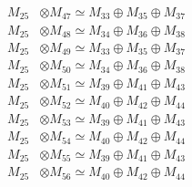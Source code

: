 \begin{align*}
M_{25} &\otimes M_{47} \simeq M_{33} \oplus M_{35} \oplus M_{37} \\
M_{25} &\otimes M_{48} \simeq M_{34} \oplus M_{36} \oplus M_{38} \\
M_{25} &\otimes M_{49} \simeq M_{33} \oplus M_{35} \oplus M_{37} \\
M_{25} &\otimes M_{50} \simeq M_{34} \oplus M_{36} \oplus M_{38} \\
M_{25} &\otimes M_{51} \simeq M_{39} \oplus M_{41} \oplus M_{43} \\
M_{25} &\otimes M_{52} \simeq M_{40} \oplus M_{42} \oplus M_{44} \\
M_{25} &\otimes M_{53} \simeq M_{39} \oplus M_{41} \oplus M_{43} \\
M_{25} &\otimes M_{54} \simeq M_{40} \oplus M_{42} \oplus M_{44} \\
M_{25} &\otimes M_{55} \simeq M_{39} \oplus M_{41} \oplus M_{43} \\
M_{25} &\otimes M_{56} \simeq M_{40} \oplus M_{42} \oplus M_{44} \\
\end{align*}


